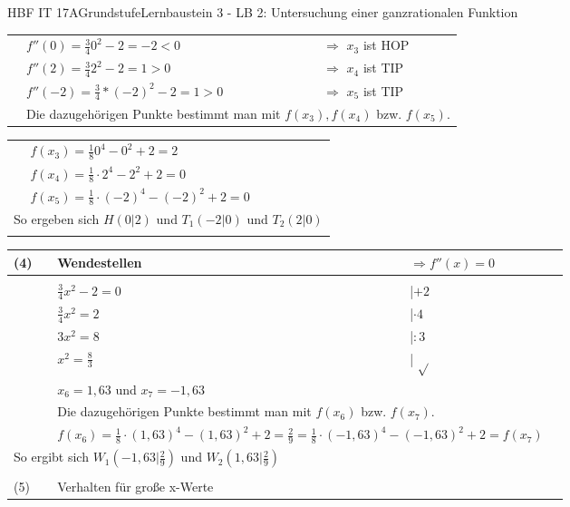 \documentclass[oneside,openany,headings=optiontotoc,11pt,numbers=noenddot]{scrreprt}
\begin{document}
\begin{worksheet}{HBF IT 17A}{Grundstufe}{Lernbaustein 3 - LB 2: Untersuchung einer ganzrationalen Funktion}
\begin{framed}
\begin{tabularx}{\textwidth}{lXXl}
				& \multicolumn{2}{l}{\(f''(0) =  \frac{3}{4}0^2 -2 = -2 < 0\)} & \(\Rightarrow\) \colorbox{green!10}{\(x_3\) ist HOP}\\		 
				& \multicolumn{2}{l}{\(f''(2) =  \frac{3}{4}2^2 -2 = 1 > 0\)} & \(\Rightarrow\) \colorbox{green!10}{\(x_4\) ist TIP}\\
				& \multicolumn{2}{l}{\(f''(-2) =  \frac{3}{4}*(-2)^2 -2 = 1 > 0\)} & \(\Rightarrow\) \colorbox{green!10}{\(x_5\) ist TIP}\\
				& \multicolumn{3}{l}{Die dazugehörigen Punkte bestimmt man mit \(f(x_3), f(x_4)\) bzw. \(f(x_5)\).}\\
			\end{tabularx}
			\begin{tabularx}{\textwidth}{ll}
				& \(f(x_3) = \frac{1}{8}0^4 -0^2+2 = 2\)\\
				& \(f(x_4) = \frac{1}{8}\cdot 2^4 -2^2+2 = 0\)\\
				& \(f(x_5) = \frac{1}{8}\cdot (-2)^4 -(-2)^2+2 = 0\)\\
				\multicolumn{2}{l}{So ergeben sich \colorbox{blue!5}{\(H(0|2)\)} und \colorbox{blue!5}{\(T_1(-2|0)\)} und \colorbox{blue!5}{\(T_2(2|0)\)}}\\
				\hline\hline\\
			\end{tabularx}
			\begin{tabularx}{\textwidth}{lXXl}
				(4) & Wendestellen & \(\Rightarrow f''(x) = 0\)\\
				\hline\\
				& \(\frac{3}{4}x^2 -2 = 0\) & |\(+2\)\\
				& \(\frac{3}{4}x^2 = 2\) & |\(\cdot 4\)\\
				& \(3x^2 = 8\) & |\(:3\)\\
				& \(x^2 = \frac{8}{3}\) & | \(\sqrt{}\)\\
				& \colorbox{green!10}{\(x_6 = 1,63\)} und \colorbox{blue!5}{\(x_7 = -1,63\)}\\
				& \multicolumn{2}{l}{Die dazugehörigen Punkte bestimmt man mit \(f(x_6)\) bzw. \(f(x_7)\).}\\
				& \multicolumn{2}{l}{\(f(x_6) = \frac{1}{8}\cdot(1,63)^4 -(1,63)^2+2 = \frac{2}{9} = \frac{1}{8}\cdot(-1,63)^4 -(-1,63)^2+2 = f(x_7)\)}\\
				\multicolumn{2}{l}{So ergibt sich \colorbox{blue!5}{\(W_1(-1,63|\frac{2}{9})\)} und \colorbox{blue!5}{\(W_2(1,63|\frac{2}{9})\)}}\\
				\hline\hline\\
				(5) & Verhalten für große x-Werte\\

\end{tabularx}
\end{framed}
\end{worksheet}
\end{document}
